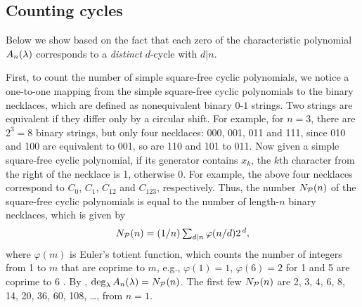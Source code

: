 \documentclass{ws-ijbc}
\begin{document}
\subsection{\label{sec:degprimfac}Counting cycles}


Below we show  based on the fact that
  each zero of the characteristic polynomial $A_n(\lambda)$
  corresponds to a \emph{distinct} $d$-cycle with $d|n$.





First, to count the number of simple square-free cyclic polynomials,
  we notice a one-to-one mapping
  from the simple square-free cyclic polynomials
  to the binary necklaces,
%
which are defined as nonequivalent binary $0$-$1$ strings.
%
Two strings are equivalent if they differ only by a circular shift.
%
For example, for $n = 3$, there are $2^3 = 8$ binary strings,
but only four necklaces: 000, 001, 011 and 111,
since 010 and 100 are equivalent to 001,
so are 110 and 101 to 011.
%
%
Now given a simple square-free cyclic polynomial, if its generator contains $x_k$,
  the $k$th character from the right of the necklace is 1,
  otherwise 0.
For example, the above four necklaces correspond to
  $C_0$, $C_1$, $C_{12}$ and $C_{123}$, respectively.
Thus,
%
the number $N_\mathcal P(n)$ of the square-free cyclic polynomials
  is equal to the number of length-$n$ binary necklaces,
  which is given by \cite{riordan}
\begin{equation}
  N_\mathcal P(n) = (1/n) \textstyle\sum_{d|n} \varphi(n/d) 2^{\,d},
\label{eq:necklace}
\end{equation}
%
%
where $\varphi(m)$ is Euler's totient function,
  which counts the number of integers from 1 to $m$
  that are coprime to $m$,
  e.g.,
  $\varphi(1) = 1$,
  $\varphi(6) = 2$ for 1 and 5 are coprime to 6 \cite{hardy}.
%
By ,
  $\deg_\lambda A_n(\lambda) = N_\mathcal P(n)$.
The first few $N_\mathcal P(n)$ are
2, 3, 4, 6, 8, 14, 20, 36, 60, 108, \dots, %
  from $n = 1$.
\end{document}
